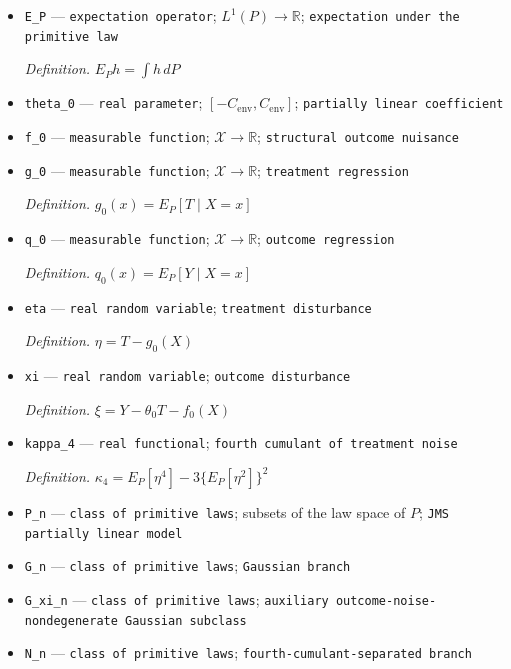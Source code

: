 \documentclass{article}
\begin{document}
\begin{itemize}
  \par\smallskip\noindent\emph{Definition.} \(P_X(A)=P\{X\in A\}\)
  \item \texttt{E\_\allowbreak{}P} --- \texttt{expectation operator}; \(L^1(P)\to\mathbb R\); \texttt{expectation under the primitive law}
  \par\smallskip\noindent\emph{Definition.} \(E_Ph=\int h\,dP\)
  \item \texttt{theta\_\allowbreak{}0} --- \texttt{real parameter}; \([-C_{\mathrm{env}},C_{\mathrm{env}}]\); \texttt{partially linear coefficient}
  \item \texttt{f\_\allowbreak{}0} --- \texttt{measurable function}; \(\mathcal X\to\mathbb R\); \texttt{structural outcome nuisance}
  \item \texttt{g\_\allowbreak{}0} --- \texttt{measurable function}; \(\mathcal X\to\mathbb R\); \texttt{treatment regression}
  \par\smallskip\noindent\emph{Definition.} \(g_0(x)=E_P[T\mid X=x]\)
  \item \texttt{q\_\allowbreak{}0} --- \texttt{measurable function}; \(\mathcal X\to\mathbb R\); \texttt{outcome regression}
  \par\smallskip\noindent\emph{Definition.} \(q_0(x)=E_P[Y\mid X=x]\)
  \item \texttt{eta} --- \texttt{real random variable}; \texttt{treatment disturbance}
  \par\smallskip\noindent\emph{Definition.} \(\eta=T-g_0(X)\)
  \item \texttt{xi} --- \texttt{real random variable}; \texttt{outcome disturbance}
  \par\smallskip\noindent\emph{Definition.} \(\xi=Y-\theta_0T-f_0(X)\)
  \item \texttt{kappa\_\allowbreak{}4} --- \texttt{real functional}; \texttt{fourth cumulant of treatment noise}
  \par\smallskip\noindent\emph{Definition.} \(\kappa_4=E_P[\eta^4]-3\{E_P[\eta^2]\}^2\)
  \item \texttt{P\_\allowbreak{}n} --- \texttt{class of primitive laws}; subsets of the law space of \(P\); \texttt{JMS partially linear model}
  \item \texttt{G\_\allowbreak{}n} --- \texttt{class of primitive laws}; \texttt{Gaussian branch}
  \item \texttt{G\_\allowbreak{}xi\_\allowbreak{}n} --- \texttt{class of primitive laws}; \texttt{auxiliary outcome-\allowbreak{}noise-\allowbreak{}nondegenerate Gaussian subclass}
  \item \texttt{N\_\allowbreak{}n} --- \texttt{class of primitive laws}; \texttt{fourth-\allowbreak{}cumulant-\allowbreak{}separated branch}

\end{itemize}
\end{document}
